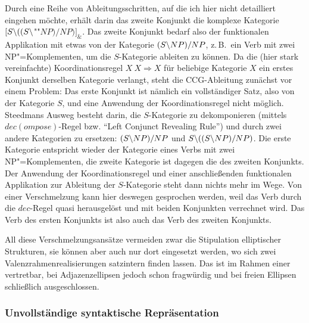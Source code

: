 Durch eine Reihe von Ableitungsschritten, auf die ich hier nicht detailliert eingehen möchte, erhält darin das zweite Konjunkt die komplexe Kategorie $[S\backslash ((S\backslash$""$\mathit{NP})/\mathit{NP})]_\&$. Das zweite Konjunkt bedarf also der funktionalen Applikation mit etwas von der Kategorie $(S\backslash NP)/NP$, z.\,B.\ ein Verb mit zwei NP"=Komplementen, um die $S$-Kategorie ableiten zu können. Da die (hier stark vereinfachte) Koordinationsregel $X ~ X \Rightarrow X$ für beliebige Kategorie $X$ ein erstes Konjunkt derselben Kategorie verlangt, steht die CCG-Ableitung zunächst vor einem Problem: Das erste Konjunkt ist nämlich ein vollständiger Satz, also von der Kategorie $S$, und eine Anwendung der Koordinationsregel nicht möglich. Steedmans Ausweg besteht darin, die $S$-Kategorie zu dekomponieren (mittels $dec(ompose)$-Regel bzw. "`Left Conjunct Revealing Rule"') und durch zwei andere Kategorien zu ersetzen: $(S\backslash NP)/NP$ und $S\backslash((S\backslash NP)/NP)$. Die erste Kategorie entspricht wieder der Kategorie eines Verbs mit zwei NP"=Komplementen, die zweite Kategorie ist dagegen die des zweiten Konjunkts. Der Anwendung der Koordinationsregel und einer anschlie\ss enden funktionalen Applikation zur Ableitung der $S$-Kategorie steht dann nichts mehr im Wege. Von einer Verschmelzung kann hier deswegen gesprochen werden, weil das Verb durch die $dec$-Regel quasi herausgelöst und mit beiden Konjunkten verrechnet wird. Das Verb des ersten Konjunkts ist also auch das Verb des zweiten Konjunkts. 

All diese Verschmelzungsansätze vermeiden zwar die Stipulation elliptischer Strukturen, sie können aber auch nur dort eingesetzt werden, wo sich zwei Valenzrahmenrealisierungen satzintern finden lassen. Das ist im Rahmen einer  vertretbar, bei Adjazenzellipsen jedoch schon fragwürdig und bei freien Ellipsen schlie\ss lich ausgeschlossen.

\subsubsection*{Unvollständige syntaktische Repräsentation}  

